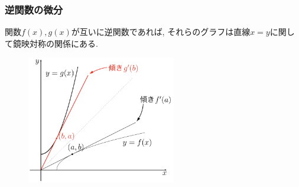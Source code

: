 

\begin{frame}
\frametitle{逆関数の微分}


関数$f(x),g(x)$が互いに逆関数であれば, それらのグラフは直線$x=y$に関して鏡映対称の関係にある. 


 \begin{figure}[htbp]
 \begin{center} 
  \includegraphics[width=65mm]{calculus6/diff_inv.png}
 \end{center}
\end{figure}



\end{frame}





%
%



